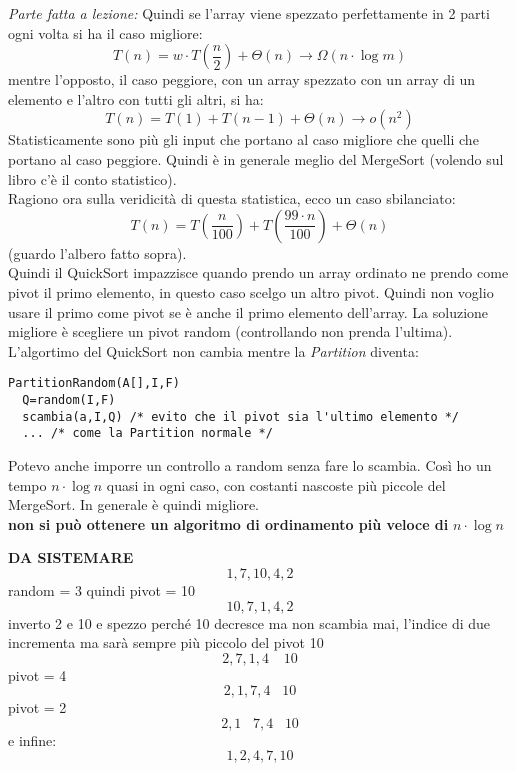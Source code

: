 \documentclass[a4paper,12pt,oneside,tikz]{book}
\begin{document}
\textit{Parte fatta a lezione:}
Quindi se l'array viene spezzato perfettamente in 2 parti ogni volta si ha il caso migliore:
$$T(n)=w\cdot T\left(\frac{n}{2}\right)+\Theta(n)\rightarrow \Omega(n\cdot \log m)$$
mentre l'opposto, il caso peggiore, con un array spezzato con un array di un elemento e l'altro con tutti gli altri, si ha:
$$T(n)=T(1)+T(n-1)+\Theta(n)\rightarrow o(n^2)$$
Statisticamente sono più gli input che portano al caso migliore che quelli che portano al caso peggiore. Quindi è in generale meglio del MergeSort (volendo sul libro c'è il conto statistico).\\
Ragiono ora sulla veridicità di questa statistica, ecco un caso sbilanciato:
$$T(n)=T\left(\frac{n}{100}\right)+T\left(\frac{99\cdot n}{100}\right)+\Theta(n)$$ (guardo l'albero fatto sopra).\\
Quindi il QuickSort impazzisce quando prendo un array ordinato ne prendo come pivot il primo elemento, in questo caso scelgo un altro pivot. Quindi non voglio usare il primo come pivot se è anche il primo elemento dell'array. La soluzione migliore è scegliere un pivot random (controllando non prenda l'ultima). L'algortimo del QuickSort non cambia mentre la \textit{Partition} diventa:
\begin{verbatim}
PartitionRandom(A[],I,F)
  Q=random(I,F)
  scambia(a,I,Q) /* evito che il pivot sia l'ultimo elemento */
  ... /* come la Partition normale */
\end{verbatim}
Potevo anche imporre un controllo a random senza fare lo scambia.
Così ho un tempo $n\cdot\log n$ quasi in ogni caso, con costanti nascoste più piccole del MergeSort. In generale è quindi migliore.\\
\textbf{non si può ottenere un algoritmo di ordinamento più veloce di} $n\cdot\log n$
\begin{esempio}
	\textbf{DA SISTEMARE}
	$$1,7,10,4,2$$
	random = 3 quindi pivot = 10
	$$10,7,1,4,2$$
	inverto 2 e 10 e spezzo perché 10 decresce ma non scambia mai, l'indice di due incrementa ma sarà sempre più piccolo del pivot 10
	$$2,7,1,4\,\,\,\,\,\ 10$$
	pivot = 4
	$$2,1,7,4\,\,\,\,\,10$$
	pivot = 2
	$$2,1\,\,\,\,\,7,4\,\,\,\,\,10$$
	e infine:
	$$1,2,4,7,10$$
\end{esempio}
\newpage
\end{document}
